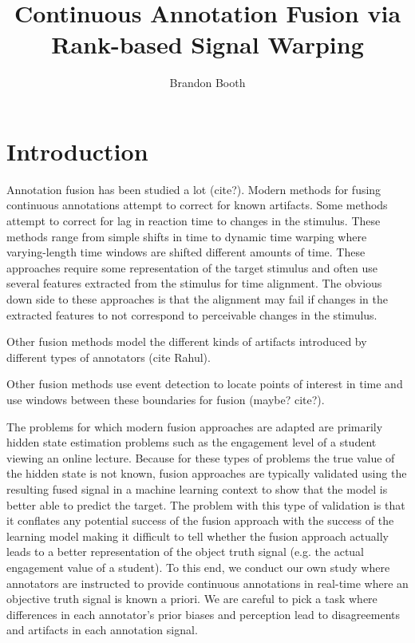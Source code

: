 \documentclass[]{article}
\title{Continuous Annotation Fusion via Rank-based Signal Warping}
\author{Brandon Booth}
\begin{document}
\maketitle

\section{Introduction}
Annotation fusion has been studied a lot (cite?).  Modern methods for fusing continuous annotations attempt to correct for known artifacts.  Some methods attempt to correct for lag in reaction time to changes in the stimulus.  These methods range from simple shifts in time to dynamic time warping where varying-length time windows are shifted different amounts of time.  These approaches require some representation of the target stimulus and often use several features extracted from the stimulus for time alignment.  The obvious down side to these approaches is that the alignment may fail if changes in the extracted features to not correspond to perceivable changes in the stimulus.

Other fusion methods model the different kinds of artifacts introduced by different types of annotators (cite Rahul).

Other fusion methods use event detection to locate points of interest in time and use windows between these boundaries for fusion (maybe? cite?).

The problems for which modern fusion approaches are adapted are primarily hidden state estimation problems such as the engagement level of a student viewing an online lecture.  Because for these types of problems the true value of the hidden state is not known, fusion approaches are typically validated using the resulting fused signal in a machine learning context to show that the model is better able to predict the target.  The problem with this type of validation is that it conflates any potential success of the fusion approach with the success of the learning model making it difficult to tell whether the fusion approach actually leads to a better representation of the object truth signal (e.g. the actual engagement value of a student).  To this end, we conduct our own study where annotators are instructed to provide continuous annotations in real-time where an objective truth signal is known a priori.  We are careful to pick a task where differences in each annotator's prior biases and perception lead to disagreements and artifacts in each annotation signal.
\end{document}
